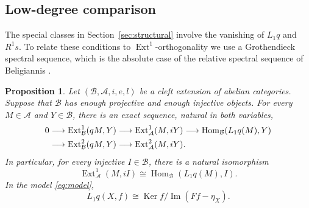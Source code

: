 \documentclass[11pt]{amsart}
\newtheorem{proposition}[theorem]{Proposition}
\theoremstyle{definition}
\theoremstyle{remark}
\theoremstyle{plain}
\numberwithin{equation}{section}
\begin{document}
\subsection{Low-degree comparison}

The special classes in Section~\ref{sec:structural} involve the
vanishing of $L_1q$ and $R^1s$. To relate these conditions to
$\operatorname{Ext}^1$-orthogonality we use a Grothendieck spectral sequence, which is
the absolute case of the relative spectral sequence of Beligiannis
\cite[Proposition~7.1]{BelRelative}.

\begin{proposition}\label{prop:low-degree}
Let $(\mathcal{B},\mathcal{A},i,e,l)$ be a cleft extension of abelian categories.
Suppose that $\mathcal{B}$ has enough projective and enough injective objects. For every $M\in\mathcal{A}$ and $Y\in\mathcal{B}$, there is an exact sequence, natural in both variables,
\begin{align}
 0 & \longrightarrow \operatorname{Ext}^1_{\mathcal{B}}(qM, Y)
\longrightarrow \operatorname{Ext}^1_{\mathcal{A}}(M, iY)
\longrightarrow \operatorname{Hom}_{\mathcal{B}}(L_1q(M), Y) \notag\\
 & \longrightarrow \operatorname{Ext}^2_{\mathcal{B}}(qM, Y)
\longrightarrow \operatorname{Ext}^2_{\mathcal{A}}(M, iY).
 \label{eq:five-term}
\end{align}
In particular, for every injective $I \in \mathcal{B}$, there is a natural isomorphism
\begin{equation}\label{eq:injective-test}
 \operatorname{Ext}^1_{\mathcal{A}}(M, iI) \cong \operatorname{Hom}_{\mathcal{B}}(L_1q(M), I).
\end{equation}
In the model \eqref{eq:model},
\begin{equation}\label{eq:L1q-model}
 L_1q(X, f) \cong
 \operatorname{Ker} f/\operatorname{Im}(Ff-\eta_X).
\end{equation}

\end{proposition}
\end{document}
